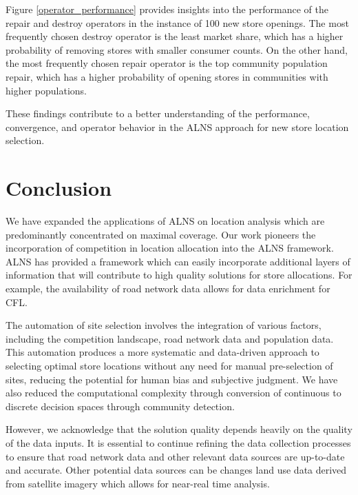 \documentclass{ecai}
\begin{document}

Figure \ref{operator_performance} provides insights into the performance of the repair and destroy operators in the instance of 100 new store openings. The most frequently chosen destroy operator is the least market share, which has a higher probability of removing stores with smaller consumer counts. On the other hand, the most frequently chosen repair operator is the top community population repair, which has a higher probability of opening stores in communities with higher populations.

These findings contribute to a better understanding of the performance, convergence, and operator behavior in the ALNS approach for new store location selection.

\section{Conclusion}
We have expanded the applications of ALNS on location analysis which are predominantly concentrated on maximal coverage. Our work pioneers the incorporation of competition in location allocation into the ALNS framework. ALNS has provided a framework which can easily incorporate additional layers of information that will contribute to high quality solutions for store allocations. For example, the availability of road network data allows for data enrichment for CFL.

The automation of site selection involves the integration of various factors, including the competition landscape, road network data and population data. This automation produces a more systematic and data-driven approach to selecting optimal store locations without any need for manual pre-selection of sites, reducing the potential for human bias and subjective judgment. We have also reduced the computational complexity through conversion of continuous to discrete decision spaces through community detection.

However, we acknowledge that the solution quality depends heavily on the quality of the data inputs. It is essential to continue refining the data collection processes to ensure that road network data and other relevant data sources are up-to-date and accurate. Other potential data sources can be changes land use data derived from satellite imagery which allows for near-real time analysis.
\end{document}
